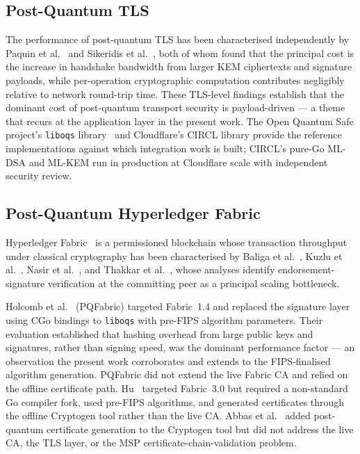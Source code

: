 \documentclass{ieeetj}
\begin{document}
\subsection{Post-Quantum TLS}

The performance of post-quantum TLS has been characterised independently by
Paquin et al.~\cite{paquin2020benchmark} and Sikeridis et al.~\cite{sikeridis2020},
both of whom found that the principal cost is the increase in handshake bandwidth
from larger KEM ciphertexts and signature payloads, while per-operation
cryptographic computation contributes negligibly relative to network round-trip
time. These TLS-level findings establish that the dominant cost of post-quantum
transport security is payload-driven --- a theme that recurs at the
application layer in the present work. The Open Quantum Safe project's
\texttt{liboqs} library~\cite{stebila2016oqs} and Cloudflare's CIRCL library
provide the reference implementations against which integration work is built;
CIRCL's pure-Go ML-DSA and ML-KEM run in production at Cloudflare scale with
independent security review.

\subsection{Post-Quantum Hyperledger Fabric}

Hyperledger Fabric~\cite{androulaki2018} is a permissioned blockchain whose
transaction throughput under classical cryptography has been characterised by
Baliga et al.~\cite{baliga2018performance}, Kuzlu et
al.~\cite{kuzlu2021performance}, Nasir et al.~\cite{nasir2018}, and Thakkar et
al.~\cite{thakkar2018}, whose analyses identify endorsement-signature
verification at the committing peer as a principal scaling bottleneck. 

Holcomb et al.~\cite{holcomb2021} (PQFabric) targeted Fabric~1.4 and replaced the
signature layer using CGo bindings to \texttt{liboqs} with pre-FIPS algorithm
parameters. Their evaluation established that hashing overhead from large public
keys and signatures, rather than signing speed, was the dominant performance
factor --- an observation the present work corroborates and extends to the
FIPS-finalised algorithm generation. PQFabric did not extend the live Fabric CA
and relied on the offline certificate path. Hu~\cite{hu2025prototype} targeted
Fabric~3.0 but required a non-standard Go compiler fork, used pre-FIPS
algorithms, and generated certificates through the offline Cryptogen tool rather
than the live CA. Abbas et al.~\cite{abbas2025} added post-quantum certificate
generation to the Cryptogen tool but did not address the live CA, the TLS layer,
or the MSP certificate-chain-validation problem.
\end{document}
